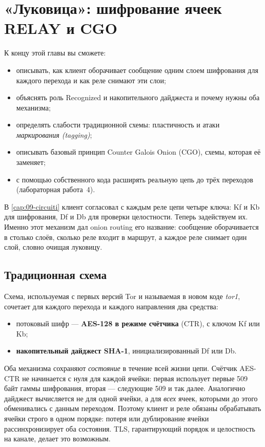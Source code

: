 \chapter{«Луковица»: шифрование ячеек RELAY и CGO}\label{cap:10-cifratura-relay}

\begin{obiettivi}
К концу этой главы вы сможете:
\begin{itemize}[nosep]
  \item описывать, как клиент оборачивает сообщение одним слоем шифрования для каждого перехода и как реле снимают эти слои;
  \item объяснять роль Recognized и накопительного дайджеста и почему нужны оба механизма;
  \item определять слабости традиционной схемы: пластичность и атаки \emph{маркирования (tagging)};
  \item описывать базовый принцип Counter Galois Onion (CGO), схемы, которая её заменяет;
  \item с помощью собственного кода расширять реальную цепь до трёх переходов (лабораторная работа~4).
\end{itemize}
\end{obiettivi}

В \cref{cap:09-circuiti} клиент согласовал с каждым реле цепи четыре ключа: Kf и Kb для шифрования, Df и Db для проверки целостности. Теперь задействуем их. Именно этот механизм дал onion routing его название: сообщение оборачивается в столько слоёв, сколько реле входит в маршрут, а каждое реле снимает один слой, словно очищая луковицу.

\section{Традиционная схема}\label{sec:tor1}

Схема, используемая с первых версий Tor и называемая в новом коде \emph{tor1}, сочетает для каждого перехода и каждого направления два средства:
\begin{itemize}
  \item потоковый шифр --- \textbf{AES-128 в режиме счётчика} (CTR), с ключом Kf или Kb;
  \item \textbf{накопительный дайджест SHA-1}, инициализированный Df или Db.
\end{itemize}
Оба механизма сохраняют \emph{состояние} в течение всей жизни цепи. Счётчик AES-CTR не начинается с нуля для каждой ячейки: первая использует первые 509 байт гаммы шифрования, вторая --- следующие 509 и так далее. Аналогично дайджест вычисляется не для одной ячейки, а для \emph{всех} ячеек, которыми до этого обменивались с данным переходом. Поэтому клиент и реле обязаны обрабатывать ячейки строго в одном порядке: потеря или дублирование ячейки рассинхронизирует оба состояния. TLS, гарантирующий порядок и целостность на канале, делает это возможным.

